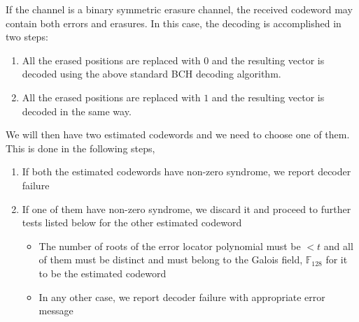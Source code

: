 \documentclass[10 pt]{article}
\begin{document}
If the channel is a binary symmetric erasure channel, the received codeword may contain both errors and erasures. In this case, the decoding is accomplished in two steps: 
\renewcommand{\labelenumi}{(\roman{enumi})}
\begin{enumerate}
	\item All the erased positions are replaced with $0$ and the  resulting vector is decoded using the above standard BCH decoding algorithm.
	\item All the erased positions are replaced with $1$ and the  resulting vector is decoded in the same way.
\end{enumerate}
We will then have two estimated codewords and we need to choose one of them. This is done in the following steps,
\renewcommand{\labelenumi}{(\roman{enumi})}
\begin{enumerate}
	\item If both the estimated codewords have non-zero syndrome, we report decoder failure
    \item If one of them have non-zero syndrome, we discard it and proceed to further tests listed below for the other estimated codeword
    	\begin{itemize}
    		\item The number of roots of the error locator polynomial must be $<t$ and all of them must be distinct and must belong to the Galois field, $\mathbb{F}_{128}$ for it to be the estimated codeword
            \item In any other case, we report decoder failure with appropriate error message
    	\end{itemize}
\end{enumerate}
\end{document}
